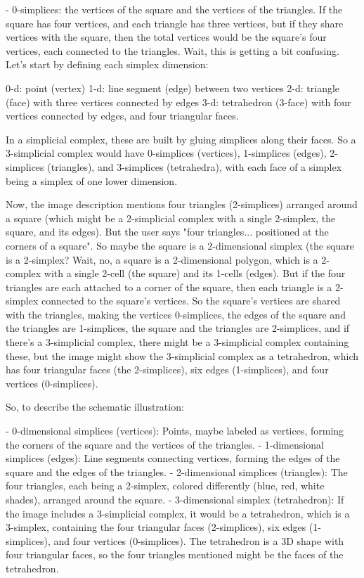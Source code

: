 - 0-simplices: the vertices of the square and the vertices of the triangles. If the square has four vertices, and each triangle has three vertices, but if they share vertices with the square, then the total vertices would be the square's four vertices, each connected to the triangles. Wait, this is getting a bit confusing. Let's start by defining each simplex dimension:

0-d: point (vertex)
1-d: line segment (edge) between two vertices
2-d: triangle (face) with three vertices connected by edges
3-d: tetrahedron (3-face) with four vertices connected by edges, and four triangular faces.

In a simplicial complex, these are built by gluing simplices along their faces. So a 3-simplicial complex would have 0-simplices (vertices), 1-simplices (edges), 2-simplices (triangles), and 3-simplices (tetrahedra), with each face of a simplex being a simplex of one lower dimension.

Now, the image description mentions four triangles (2-simplices) arranged around a square (which might be a 2-simplicial complex with a single 2-simplex, the square, and its edges). But the user says "four triangles... positioned at the corners of a square". So maybe the square is a 2-dimensional simplex (the square is a 2-simplex? Wait, no, a square is a 2-dimensional polygon, which is a 2-complex with a single 2-cell (the square) and its 1-cells (edges). But if the four triangles are each attached to a corner of the square, then each triangle is a 2-simplex connected to the square's vertices. So the square's vertices are shared with the triangles, making the vertices 0-simplices, the edges of the square and the triangles are 1-simplices, the square and the triangles are 2-simplices, and if there's a 3-simplicial complex, there might be a 3-simplicial complex containing these, but the image might show the 3-simplicial complex as a tetrahedron, which has four triangular faces (the 2-simplices), six edges (1-simplices), and four vertices (0-simplices).

So, to describe the schematic illustration:

- 0-dimensional simplices (vertices): Points, maybe labeled as vertices, forming the corners of the square and the vertices of the triangles.
- 1-dimensional simplices (edges): Line segments connecting vertices, forming the edges of the square and the edges of the triangles.
- 2-dimensional simplices (triangles): The four triangles, each being a 2-simplex, colored differently (blue, red, white shades), arranged around the square.
- 3-dimensional simplex (tetrahedron): If the image includes a 3-simplicial complex, it would be a tetrahedron, which is a 3-simplex, containing the four triangular faces (2-simplices), six edges (1-simplices), and four vertices (0-simplices). The tetrahedron is a 3D shape with four triangular faces, so the four triangles mentioned might be the faces of the tetrahedron.

